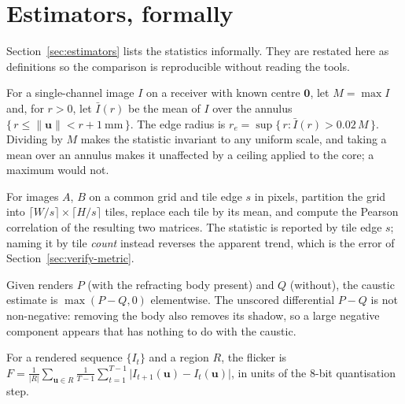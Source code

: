 \section{Estimators, formally}
\label{app:estimators}

Section~\ref{sec:estimators} lists the statistics informally. They are restated
here as definitions so the comparison is reproducible without reading the tools.

\begin{definition}
\label{def:edge}
For a single-channel image $I$ on a receiver with known centre $\mathbf{0}$,
let $M = \max I$ and, for $r > 0$, let $\bar I(r)$ be the mean of $I$ over the
annulus $\{\,r \le \|\mathbf{u}\| < r + \SI{1}{\milli\meter}\,\}$. The edge
radius is $r_e = \sup\{\, r : \bar I(r) > 0.02\,M \,\}$.
Dividing by $M$ makes the statistic invariant to any uniform scale, and taking a mean over an annulus makes it unaffected by a ceiling applied to the core; a maximum would not.
\end{definition}

\begin{definition}
\label{def:corr}
For images $A$, $B$ on a common grid and tile edge $s$ in pixels, partition the
grid into $\lceil W/s \rceil \times \lceil H/s \rceil$ tiles, replace each tile by
its mean, and compute the Pearson correlation of the resulting two matrices. The
statistic is reported by tile edge $s$; naming it by tile \emph{count} instead
reverses the apparent trend, which is the error of
Section~\ref{sec:verify-metric}.
\end{definition}

\begin{definition}
\label{def:pospart}
Given renders $P$ (with the refracting body present) and $Q$ (without), the
caustic estimate is $\max(P - Q, 0)$ elementwise. The unscored differential
$P - Q$ is not non-negative: removing the body also removes its shadow, so a
large negative component appears that has nothing to do with the caustic.
\end{definition}

\begin{definition}
\label{def:flicker}
For a rendered sequence $\{I_t\}$ and a region $R$, the flicker is
$F = \frac{1}{|R|}\sum_{\mathbf{u} \in R} \frac{1}{T-1}\sum_{t=1}^{T-1}\big| I_{t+1}(\mathbf{u}) - I_t(\mathbf{u}) \big|$,
in units of the 8-bit quantisation step.
\end{definition}

